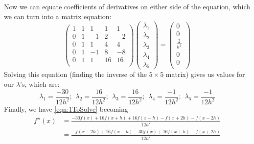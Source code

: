\documentclass[12pt]{article}
\begin{document}
\begin{enumerate}
\begin{equation}
            \label{eqn:1ToSolveExpanded}
        \end{equation}
        Now we can equate coefficients of derivatives on either side of the equation, which we can 
        turn into a matrix equation:
        \begin{equation*}
            \left(
            \begin{array}{ccccc}
                1 & 1 & 1 & 1 & 1 \\
                0 & 1 & -1 & 2 & -2 \\
                0 & 1 & 1 & 4 & 4 \\
                0 & 1 & -1 & 8 & -8 \\
                0 & 1 & 1 & 16 & 16 \\
            \end{array}
            \right)
            \left(
            \begin{array}{c}
                \lambda_1 \\
                \lambda_2 \\
                \lambda_3 \\
                \lambda_4 \\
                \lambda_5
            \end{array}
            \right)
            =
            \left(
            \begin{array}{c}
                0 \\
                0 \\
                \frac{2}{h^2} \\
                0 \\
                0 \\
            \end{array}
            \right)
        \end{equation*}
        Solving this equation (finding the inverse of the $5\times5$ matrix) gives us values for 
        our $\lambda$'s, which are:
        \begin{equation*}
            \lambda_1=\frac{-30}{12h^2};\hspace{5pt} \lambda_2=\frac{16}{12h^2};\hspace{5pt} 
            \lambda_3=\frac{16}{12h^2};\hspace{5pt} \lambda_4=\frac{-1}{12h^2};\hspace{5pt}
            \lambda_5=\frac{-1}{12h^2}
        \end{equation*}
        Finally, we have \autoref{eqn:1ToSolve} becoming
        \begin{align}
            f''(x) &= \frac{-30f(x)+16f(x+h)+16f(x-h)-f(x+2h)-f(x-2h)}{12h^2} \nonumber \\ 
            &= \frac{-f(x-2h)+16f(x-h)-30f(x)+16f(x+h)-f(x+2h)}{12h^2}
        \end{align}
        \label{eqn:1Solved}


\end{enumerate}
\end{document}
